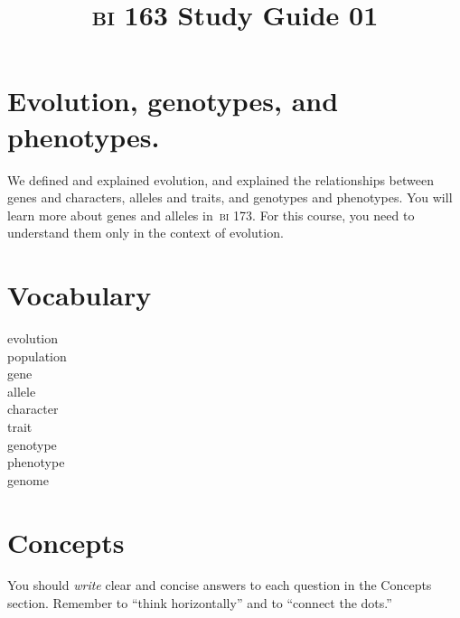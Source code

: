 \documentclass[letterpaper]{tufte-handout}
\title{{\scshape bi} 163 Study Guide 01}
\date{} %
\begin{document}
\maketitle	%

\section*{Evolution, genotypes, and phenotypes.}

We defined and explained evolution, and explained the relationships between genes and characters, alleles and traits, and genotypes and phenotypes. You will learn more about genes and alleles in~{\scshape bi} 173. For this course, you need to understand them only in the context of evolution.

\section*{Vocabulary}

\vspace{-1\baselineskip}
\begin{multicols}{2}
evolution\\
population \\
gene \\
allele \\
character \\
trait \\
genotype \\
phenotype \\
genome
\end{multicols}

\section*{Concepts}

You should \emph{write} clear and concise answers to each question in the Concepts section.  Remember to ``think horizontally'' and to ``connect the dots.'' 
\end{document}
